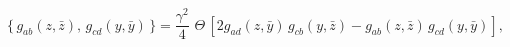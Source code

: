 \begin{equation}\label{PB-g-g}
\{\,g_{ab}(z,\bar z),\, g_{cd}(y,\bar y)\,\}=\frac{\gamma^2}{4}\,
\,\Theta\,[2 g_{ad}(z,\bar y)\,g_{cb}(y,\bar z)-
g_{ab}(z,\bar z)\,g_{cd}(y,\bar y)],
\end{equation}

